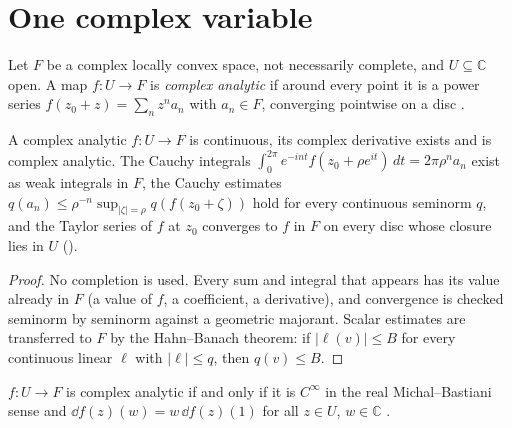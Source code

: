 \section{One complex variable}

Let $F$ be a complex locally convex space, not necessarily complete, and $U \subseteq \mathbb{C}$
open. A map $f \colon U \to F$ is \emph{complex analytic} if around every point it is a power
series $f(z_0 + z) = \sum_n z^n a_n$ with $a_n \in F$, converging pointwise on a disc
\cite[Rem.~2.1.3]{GN26}.

\begin{theorem}
  \label{thm:one-var-power-series}
  \leanok
  A complex analytic $f \colon U \to F$ is continuous, its complex derivative exists and is
  complex analytic. The Cauchy integrals
  $\int_0^{2\pi} e^{-int} f(z_0 + \rho e^{it})\, dt = 2\pi \rho^n a_n$ exist as weak integrals in
  $F$, the Cauchy estimates $q(a_n) \le \rho^{-n} \sup_{|\zeta| = \rho} q(f(z_0 + \zeta))$ hold
  for every continuous seminorm $q$, and the Taylor series of $f$ at $z_0$ converges to $f$ in $F$
  on every disc whose closure lies in $U$ (\cite[Cor.~2.1.8, Lemma~2.1.10]{GN26}).
\end{theorem}

\begin{proof}
  \leanok
  No completion is used. Every sum and integral that appears has its value already in $F$ (a value
  of $f$, a coefficient, a derivative), and convergence is checked seminorm by seminorm against a
  geometric majorant. Scalar estimates are transferred to $F$ by the Hahn--Banach theorem: if
  $|\ell(v)| \le B$ for every continuous linear $\ell$ with $|\ell| \le q$, then $q(v) \le B$.
\end{proof}

\begin{theorem}[Complex analytic $=$ real smooth with complex linear differential]
  \label{thm:one-var-iff}
  \leanok
  $f \colon U \to F$ is complex analytic if and only if it is $C^\infty$ in the real
  Michal--Bastiani sense and $\dd f(z)(w) = w\, \dd f(z)(1)$ for all $z \in U$, $w \in \mathbb{C}$
  \cite[Cor.~2.1.9]{GN26}.
\end{theorem}

